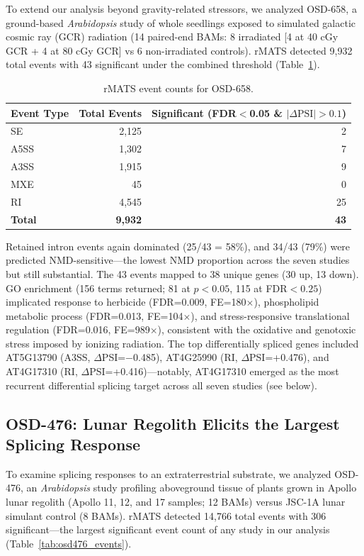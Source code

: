 \documentclass[12pt,a4paper]{article}
\begin{document}
To extend our analysis beyond gravity-related stressors, we analyzed OSD-658, a ground-based \textit{Arabidopsis} study of whole seedlings exposed to simulated galactic cosmic ray (GCR) radiation (14 paired-end BAMs: 8 irradiated [4 at 40 cGy GCR + 4 at 80 cGy GCR] vs 6 non-irradiated controls). rMATS detected 9,932 total events with 43 significant under the combined threshold (Table~\ref{tab:osd658_events}).

\begin{table}[h]
\centering
\caption{rMATS event counts for OSD-658.}
\label{tab:osd658_events}
\begin{tabular}{lrr}
\toprule
\textbf{Event Type} & \textbf{Total Events} & \textbf{Significant (FDR$<$0.05 \& $|\Delta\text{PSI}|>0.1$)} \\
\midrule
SE & 2,125 & 2 \\
A5SS & 1,302 & 7 \\
A3SS & 1,915 & 9 \\
MXE & 45 & 0 \\
RI & 4,545 & 25 \\
\textbf{Total} & \textbf{9,932} & \textbf{43} \\
\bottomrule
\end{tabular}
\end{table}

Retained intron events again dominated (25/43 = 58\%), and 34/43 (79\%) were predicted NMD-sensitive---the lowest NMD proportion across the seven studies but still substantial. The 43 events mapped to 38 unique genes (30 up, 13 down). GO enrichment (156 terms returned; 81 at $p<0.05$, 115 at FDR$<0.25$) implicated response to herbicide (FDR=0.009, FE=180$\times$), phospholipid metabolic process (FDR=0.013, FE=104$\times$), and stress-responsive translational regulation (FDR=0.016, FE=989$\times$), consistent with the oxidative and genotoxic stress imposed by ionizing radiation. The top differentially spliced genes included AT5G13790 (A3SS, $\Delta$PSI=$-$0.485), AT4G25990 (RI, $\Delta$PSI=+0.476), and AT4G17310 (RI, $\Delta$PSI=+0.416)---notably, AT4G17310 emerged as the most recurrent differential splicing target across all seven studies (see below).

\subsection{OSD-476: Lunar Regolith Elicits the Largest Splicing Response}

To examine splicing responses to an extraterrestrial substrate, we analyzed OSD-476, an \textit{Arabidopsis} study profiling aboveground tissue of plants grown in Apollo lunar regolith (Apollo 11, 12, and 17 samples; 12 BAMs) versus JSC-1A lunar simulant control (8 BAMs). rMATS detected 14,766 total events with 306 significant---the largest significant event count of any study in our analysis (Table~\ref{tab:osd476_events}).
\end{document}
